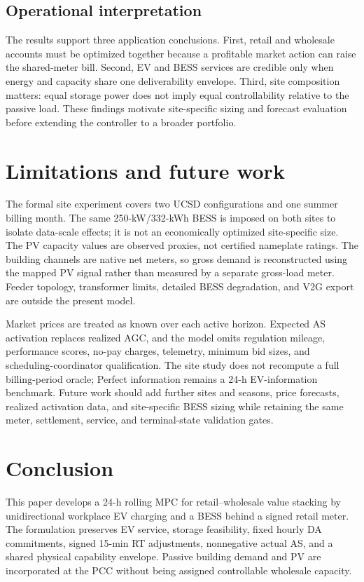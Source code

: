 \documentclass[final,5p,times]{elsarticle}
\begin{document}
\subsection{Operational interpretation}

The results support three application conclusions. First, retail and wholesale
accounts must be optimized together because a profitable market action can
raise the shared-meter bill. Second, EV and BESS services are credible only
when energy and capacity share one deliverability envelope. Third, site
composition matters: equal storage power does not imply equal controllability
relative to the passive load. These findings motivate site-specific sizing and
forecast evaluation before extending the controller to a broader portfolio.

\section{Limitations and future work}
\label{sec:limitations}

The formal site experiment covers two UCSD configurations and one summer
billing month. The same 250-kW/332-kWh BESS is imposed on both sites to isolate
data-scale effects; it is not an economically optimized site-specific size.
The PV capacity values are observed proxies, not certified nameplate ratings.
The building channels are native net meters, so gross demand is reconstructed
using the mapped PV signal rather than measured by a separate gross-load meter.
Feeder topology, transformer limits, detailed BESS degradation, and V2G export
are outside the present model.

Market prices are treated as known over each active horizon. Expected AS
activation replaces realized AGC, and the model omits regulation mileage,
performance scores, no-pay charges, telemetry, minimum bid sizes, and
scheduling-coordinator qualification. The site study does not recompute a full
billing-period oracle; Perfect information remains a 24-h EV-information
benchmark. Future work should add further sites and seasons, price forecasts,
realized activation data, and site-specific BESS sizing while retaining the
same meter, settlement, service, and terminal-state validation gates.

\section{Conclusion}
\label{sec:conclusion}

This paper develops a 24-h rolling MPC for retail--wholesale value stacking by
unidirectional workplace EV charging and a BESS behind a signed retail meter.
The formulation preserves EV service, storage feasibility, fixed hourly DA
commitments, signed 15-min RT adjustments, nonnegative actual AS, and a shared
physical capability envelope. Passive building demand and PV are incorporated
at the PCC without being assigned controllable wholesale capacity.
\end{document}
